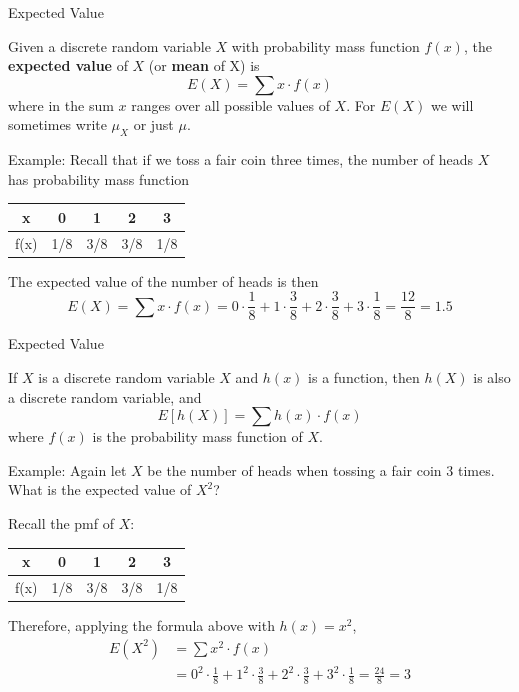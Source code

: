 \documentclass[xcolor=table]{beamer}
\renewcommand{\emph}{\textbf}
\begin{document}
\begin{frame}{Expected Value}
\begin{definition}
Given a discrete random variable $X$ with probability mass function $f(x)$, the \emph{expected value} of $X$ (or \emph{mean} of X) is
$$E(X) = \sum x\cdot f(x)$$ %
where in the sum $x$ ranges over all possible values of $X$. For $E(X)$ we will sometimes write $\mu_X$ or just $\mu$.
\end{definition}

\pause Example: Recall that if we toss a fair coin three times, the number of heads $X$ has probability mass function
\begin{center}
\begin{tabular}{c||c|c|c|c}
x & 0 & 1 & 2 & 3 \\ \hline
f(x) & 1/8 & 3/8 & 3/8 & 1/8
\end{tabular}
\end{center}
The expected value of the number of heads is then
$$E(X) = \sum x\cdot f(x) = 0\cdot\frac18+1\cdot\frac38+2\cdot\frac38+3\cdot\frac18 = \frac{12}8 = 1.5$$
\end{frame}



\begin{frame}{Expected Value}
\begin{block}{}
If $X$ is a discrete random variable $X$ and $h(x)$ is a function, then $h(X)$ is also a discrete random variable, and
$$E[h(X)] =\sum h(x)\cdot f(x)$$
where $f(x)$ is the probability mass function of $X$.
\end{block}
\pause Example: Again let $X$ be the number of heads when tossing a fair coin 3 times. What is the expected value of $X^2$?

\pause\vspace{.3cm}
Recall the pmf of $X$:
\begin{tabular}{c||c|c|c|c}
x & 0 & 1 & 2 & 3 \\ \hline
f(x) & 1/8 & 3/8 & 3/8 & 1/8
\end{tabular}

\vspace{.3cm}
Therefore, applying the formula above with $h(x)=x^2$,
\begin{align*}
E(X^2) &= \sum x^2 \cdot f(x) \\ 
&= 0^2\cdot\frac18+1^2\cdot\frac38+2^2\cdot\frac38+3^2\cdot\frac18 = \frac{24}8 = 3
\end{align*}
\end{frame}
\end{document}
